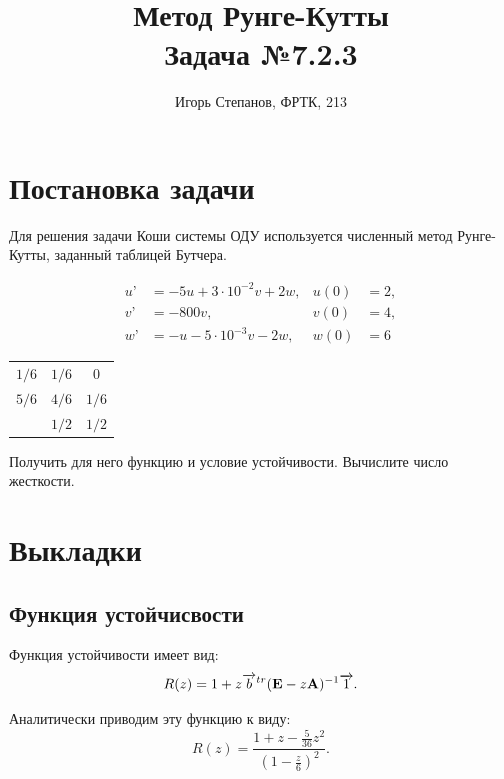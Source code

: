 \documentclass[12pt,a4paper]{article}
\title{Метод Рунге-Кутты \\ Задача №7.2.3}
\author{Игорь Степанов, ФРТК, 213}
\begin{document}
\maketitle
\hrulefill

\section{Постановка задачи} %
\label{sec:problem}

Для решения задачи Коши системы ОДУ используется численный метод Рунге-Кутты, заданный таблицей Бутчера. \par

\begin{align*}
	u’& =-5u + 3\cdot10^{-2}v + 2w,& u(0)& = 2,\\
	v’& =-800v,& v(0)& = 4,\\
	w’& =-u - 5\cdot10^{-3}v - 2w,& w(0)& = 6
\end{align*}

\begin{center}
	\begin{tabular}{ c | c c }
		$1/6$ & $1/6$ & 0 \\
		$5/6$ & $4/6$ & $1/6$ \\ \hline
		& $1/2$ & $1/2$ \\
	\end{tabular}
\end{center} \par
Получить для него функцию и условие устойчивости. Вычислите число жесткости. \par


\section{Выкладки} %
\label{sec:theory}

\subsection{Функция устойчисвости} %
\label{sub:stability}

Функция устойчивости имеет вид:
\begin{equation}
	R(z) = 1 + z \overrightarrow{b}^{tr}({\bf E} - z {\bf A})^{-1}\overrightarrow{1}.
\end{equation} \par
Аналитически приводим эту функцию к виду:
\begin{equation}
	R(z) = \dfrac{1 + z - \frac{5}{36} z^2}{(1 - \frac{z}{6})^2}.
\end{equation} \par
\end{document}
